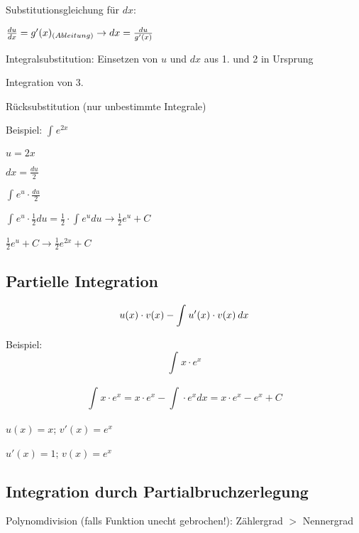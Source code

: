 \begin{multicols*}{3}
    { Substitutionsgleichung für $dx:$}

    $ \frac{du}{dx} = g'(x)_{\tiny(Ableitung)} \to dx = \frac{du}{g'(x)}$

    { Integralsubstitution: Einsetzen von $ u $ und $ dx $ aus 1. und 2 in Ursprung}

        { Integration von 3.}

        { Rücksubstitution (nur unbestimmte Integrale)}


    \begin{multicols*}{2}
        {Beispiel:}
        $\int_{}^{}e^{2x} $

        \columnbreak

        { $ u = 2x $}

        { $ dx = \frac{du}{2} $}

        { $ \int_{}{}e^u \cdot  \frac{du}{2} $}

    \end{multicols*}

    { $ \int_{}{}e^u \cdot  \frac{1}{2}du = \frac{1}{2} \cdot  \int_{}{}e^u du \rightarrow \frac{1}{2} e^u + C   $}


    { $\frac{1}{2} e^u + C \rightarrow \frac{1}{2} e^{2x} + C$ }




    \subsection{Partielle Integration}
    {\large $$u(x)\cdot v(x) - \int_{}^{}u'(x) \cdot v(x) \hspace{2px}  dx$$}

    \begin{multicols*}{2}
        {Beispiel:}
        \[ \int_{}{}x\cdot e^x\]

        $$ \int_{}{}x\cdot e^x = x\cdot e^x -  \int_{}{}\cdot e^x dx = x\cdot e^x - e^x + C $$
        \columnbreak

        {$u(x)=x$; $v'(x)=e^x$}

        {$u'(x)=1$; $v(x)=e^x$}

    \end{multicols*}


    \vfill\null
    \columnbreak


    \subsection{Integration durch Partialbruchzerlegung}
    {    Polynomdivision (falls Funktion unecht gebrochen!): Zählergrad  $>$ Nennergrad }




\end{multicols*}
